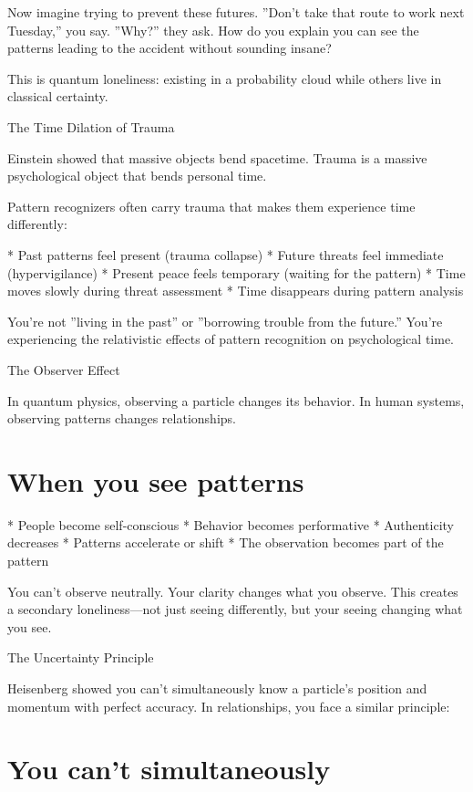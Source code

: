 \documentclass[12pt,oneside]{book}
\begin{document}
Now imagine trying to prevent these futures. ''Don't take that route to work next Tuesday,'' you say. ''Why?'' they ask. How do you explain you can see the patterns leading to the accident without sounding insane?

This is quantum loneliness: existing in a probability cloud while others live in classical certainty.

The Time Dilation of Trauma

Einstein showed that massive objects bend spacetime. Trauma is a massive psychological object that bends personal time.

Pattern recognizers often carry trauma that makes them experience time differently:

                    * Past patterns feel present (trauma collapse)
                    * Future threats feel immediate (hypervigilance)
                    * Present peace feels temporary (waiting for the pattern)
                    * Time moves slowly during threat assessment
                    * Time disappears during pattern analysis

You're not ''living in the past'' or ''borrowing trouble from the future.'' You're experiencing the relativistic effects of pattern recognition on psychological time.

The Observer Effect

In quantum physics, observing a particle changes its behavior. In human systems, observing patterns changes relationships.

\section{When you see patterns}

                    * People become self-conscious
                    * Behavior becomes performative
                    * Authenticity decreases
                    * Patterns accelerate or shift
                    * The observation becomes part of the pattern

You can't observe neutrally. Your clarity changes what you observe. This creates a secondary loneliness---not just seeing differently, but your seeing changing what you see.

The Uncertainty Principle

Heisenberg showed you can't simultaneously know a particle's position and momentum with perfect accuracy. In relationships, you face a similar principle:

\section{You can't simultaneously}
\end{document}
